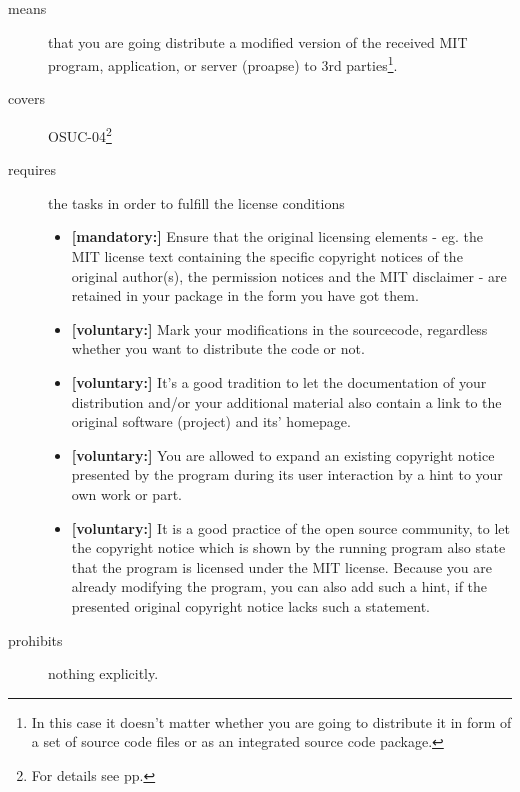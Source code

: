 \begin{description}
\item[means] that you are going distribute a modified version of the received
MIT program, application, or server (proapse) to 3rd parties\footnote{In this
case it doesn't matter whether you are going to distribute it in form of a set
of source code files or as an integrated source code package.}.
\item[covers] OSUC-04\footnote{For details see pp. \pageref{OSUC-04-DEF}}
\item[requires] the tasks in order to fulfill the license conditions
\begin{itemize}
  \item \textbf{[mandatory:]} Ensure that the original licensing elements - eg.
  the MIT license text containing the specific copyright notices of the original
  author(s), the permission notices and the MIT disclaimer - are retained in
  your package in the form you have got them.
  \item \textbf{[voluntary:]} Mark your modifications in the sourcecode,
  regardless whether you want to distribute the code or not.
  \item \textbf{[voluntary:]} It's a good tradition to let the documentation of
  your distribution and/or your additional material also contain a link to the
  original software (project) and its' homepage.
  \item \textbf{[voluntary:]} You are allowed to expand an existing copyright
  notice presented by the program during its user interaction by a hint to your
  own work or part.
  \item \textbf{[voluntary:]} It is a good practice of the open source
  community, to let the copyright notice which is shown by the running program
  also state that the program is licensed under the MIT license. Because you are
  already modifying the program, you can also add such a hint, if the presented
  original copyright notice lacks such a statement.
\end{itemize}
\item[prohibits] nothing explicitly.
\end{description}

